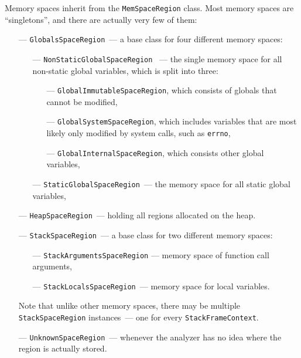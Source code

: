 \documentclass[a4paper,12pt]{article}
\begin{document}
Memory spaces inherit from the \lstinline|MemSpaceRegion| class. Most memory spaces are ``singletons'', and there are actually very few of them:
\begin{itemize}
\item[---]\lstinline|GlobalsSpaceRegion|~--- a base class for four different memory spaces:
\medskip
\begin{itemize}
\item[---]\lstinline|NonStaticGlobalSpaceRegion|
~--- the single memory space for all non-static global variables, which is split into three:
\begin{itemize}
\item[---]\lstinline|GlobalImmutableSpaceRegion|, which consists of globals that cannot be modified,
\item[---]\lstinline|GlobalSystemSpaceRegion|, which includes variables that are most likely only modified by system calls, such as \lstinline|errno|,
\item[---]\lstinline|GlobalInternalSpaceRegion|, which consists other global variables,
\end{itemize}
\item[---]\lstinline|StaticGlobalSpaceRegion|~--- the memory space for all static global variables,
\end{itemize}
\item[---]\lstinline|HeapSpaceRegion|~--- holding all regions allocated on the heap.
\item[---]\lstinline|StackSpaceRegion|~--- a base class for two different memory spaces:
\medskip
\begin{itemize}
\item[---]\lstinline|StackArgumentsSpaceRegion|
 --- memory space of function call arguments,
\item[---]\lstinline|StackLocalsSpaceRegion|~--- memory space for local variables.
\end{itemize}
Note that unlike other memory spaces, there may be multiple \lstinline|StackSpaceRegion| instances~--- one for every \lstinline|StackFrameContext|.
\item[---]\lstinline|UnknownSpaceRegion|~--- whenever the analyzer has no idea where the region is actually stored.
\end{itemize}
\end{document}
